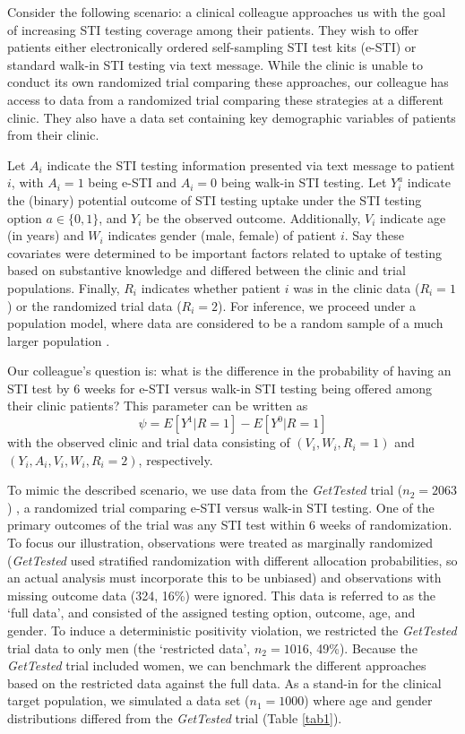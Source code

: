 \documentclass[]{article}
\begin{document}
Consider the following scenario: a clinical colleague approaches us with the goal of increasing STI testing coverage among their patients. They wish to offer patients either electronically ordered self-sampling STI test kits (e-STI) or standard walk-in STI testing via text message. While the clinic is unable to conduct its own randomized trial comparing these approaches, our colleague has access to data from a randomized trial comparing these strategies at a different clinic. They also have a data set containing key demographic variables of patients from their clinic. 

Let $A_i$ indicate the STI testing information presented via text message to patient $i$, with $A_i=1$ being e-STI and $A_i=0$ being walk-in STI testing. Let $Y_i^a$ indicate the (binary) potential outcome of STI testing uptake under the STI testing option $a\in\{0,1\}$, and $Y_i$ be the observed outcome. Additionally, $V_i$ indicate age (in years) and $W_i$ indicates gender (male, female) of patient $i$. Say these covariates were determined to be important factors related to uptake of testing based on substantive knowledge and differed between the clinic and trial populations. Finally, $R_i$ indicates whether patient $i$ was in the clinic data ($R_i=1$) or the randomized trial data ($R_i=2$). For inference, we proceed under a population model, where data are considered to be a random sample of a much larger population \cite{lehmann_elements_2004}.

Our colleague's question is: what is the difference in the probability of having an STI test by 6 weeks for e-STI versus walk-in STI testing being offered among their clinic patients? This parameter can be written as
\[\psi = E[Y^1 | R=1] - E[Y^0 | R=1]\]
with the observed clinic and trial data consisting of $(V_i, W_i, R_i=1)$ and $(Y_i, A_i, V_i, W_i, R_i=2)$, respectively.

To mimic the described scenario, we use data from the \textit{GetTested} trial ($n_2=2063$) \cite{wilson_internet-accessed_2017}, a randomized trial comparing e-STI versus walk-in STI testing. One of the primary outcomes of the trial was any STI test within 6 weeks of randomization. To focus our illustration, observations were treated as marginally randomized (\textit{GetTested} used stratified randomization with different allocation probabilities, so an actual analysis must incorporate this to be unbiased) and observations with missing outcome data (324, 16\%) were ignored. This data is referred to as the `full data', and consisted of the assigned testing option, outcome, age, and gender. To induce a deterministic positivity violation, we restricted the \textit{GetTested} trial data to only men (the `restricted data', $n_2=1016$, 49\%). Because the \textit{GetTested}  trial included women, we can benchmark the different approaches based on the restricted data against the full data. As a stand-in for the clinical target population, we simulated a data set ($n_1=1000$) where age and gender distributions differed from the \textit{GetTested} trial (Table \ref{tab1}).
\end{document}
